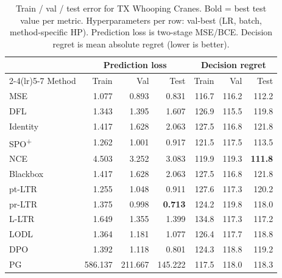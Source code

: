 \begin{table}[h]
\centering
\caption[Train/val/test error for TX Whooping Cranes.]{Train / val / test error for TX Whooping Cranes. Bold = best test value per metric. Hyperparameters per row: val-best (LR, batch, method-specific HP). Prediction loss is two-stage MSE/BCE. Decision regret is mean absolute regret (lower is better).}
\label{tab:err-asurv}
\setlength{\tabcolsep}{4pt}
\renewcommand{\arraystretch}{1.05}
\begin{tabular}{@{}lrrrrrr@{}}
\toprule
& \multicolumn{3}{c}{Prediction loss} & \multicolumn{3}{c}{Decision regret} \\
\cmidrule(lr){2-4}\cmidrule(lr){5-7}
Method & Train & Val & Test & Train & Val & Test \\
\midrule
MSE & 1.077 & 0.893 & 0.831 & 116.7 & 116.2 & 112.2 \\
DFL & 1.343 & 1.395 & 1.607 & 126.9 & 115.5 & 119.8 \\
Identity & 1.417 & 1.628 & 2.063 & 127.5 & 116.8 & 121.8 \\
SPO\textsuperscript{+} & 1.262 & 1.001 & 0.917 & 121.5 & 117.5 & 113.5 \\
NCE & 4.503 & 3.252 & 3.083 & 119.9 & 119.3 & \textbf{111.8} \\
Blackbox & 1.417 & 1.628 & 2.063 & 127.5 & 116.8 & 121.8 \\
pt-LTR & 1.255 & 1.048 & 0.911 & 127.6 & 117.3 & 120.2 \\
pr-LTR & 1.375 & 0.998 & \textbf{0.713} & 124.2 & 119.8 & 118.0 \\
L-LTR & 1.649 & 1.355 & 1.399 & 134.8 & 117.3 & 117.2 \\
LODL & 1.364 & 1.181 & 1.077 & 126.4 & 117.7 & 118.8 \\
DPO & 1.392 & 1.118 & 0.801 & 124.3 & 118.8 & 119.2 \\
PG & 586.137 & 211.667 & 145.222 & 117.5 & 118.0 & 118.3 \\
\bottomrule
\end{tabular}
\end{table}

